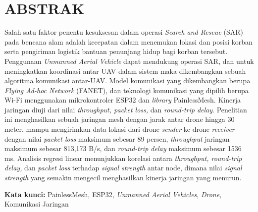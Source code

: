 \chapter*{ABSTRAK}

Salah satu faktor penentu kesuksesan dalam operasi \textit{Search and Rescue} (SAR) pada bencana alam adalah kecepatan dalam menemukan lokasi dan posisi korban serta pengiriman logistik bantuan penunjang hidup bagi korban tersebut. Penggunaan \textit{Unmanned Aerial Vehicle} dapat mendukung operasi SAR, dan untuk meningkatkan koordinasi antar UAV dalam sistem maka dikembangkan sebuah algoritma komunikasi antar-UAV. Model komunikasi yang dikembangkan berupa \textit{Flying Ad-hoc Network} (FANET), dan teknologi komunikasi yang dipilih berupa Wi-Fi menggunakan mikrokontroler ESP32 dan \textit{library} PainlessMesh. Kinerja jaringan diuji dari nilai \textit{throughput, packet loss,} dan \textit{round-trip delay}. Penelitian ini menghasilkan sebuah jaringan mesh dengan jarak antar drone hingga 30 meter, mampu mengirimkan data lokasi dari drone \textit{sender} ke drone \textit{receiver} dengan nilai \textit{packet loss} maksimum sebesar 89 persen, \textit{throughput} jaringan maksimum sebesar 813,173 B/s, dan \textit{round-trip delay} maksimum sebesar 1536 ms. Analisis regresi linear menunjukkan korelasi antara \textit{throughput, round-trip delay,} dan \textit{packet loss} terhadap \textit{signal strength} antar node, dimana nilai \textit{signal strength} yang semakin mengecil menghasilkan kinerja jaringan yang menurun.

\vspace{2em}
\noindent \textbf{Kata kunci:} PainlessMesh, ESP32, \textit{Unmanned Aerial Vehicles}, \textit{Drone}, Komunikasi Jaringan